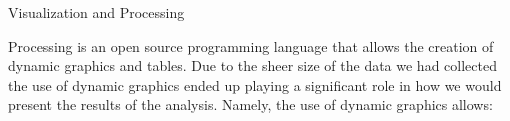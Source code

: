 \documentclass[final]{beamer}
\newlength{\onecolwid}
\begin{document}
\begin{frame}[t]
\begin{columns}[t]
\begin{column}{\onecolwid}
      \begin{block}{Visualization and Processing}
        \begin{figure}[htdp]
          \centering
        \end{figure}
	Processing is an open source programming language that allows the creation of dynamic graphics and tables. Due to the sheer size of the data we had collected the use of dynamic graphics ended up playing a significant role in how we would present the results of the analysis. Namely, the use of dynamic graphics allows:

\end{block}
\end{column}
\end{columns}
\end{frame}
\end{document}
